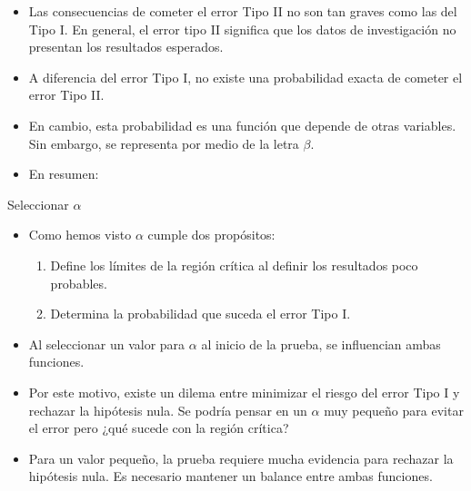 \documentclass{beamer}
\begin{document}
\begin{frame}
	\begin{itemize}
		\justifying
\item Las consecuencias de cometer el error Tipo II no son tan graves como las del Tipo I. En general, el error tipo II significa que los datos de investigación no presentan los resultados esperados.
\item A diferencia del error Tipo I, no existe una probabilidad exacta de cometer el error Tipo II.
\item En cambio, esta probabilidad es una función que depende de otras variables. Sin embargo, se representa por medio de la letra $\beta$.
\item En resumen:
	\end{itemize}
\begin{center}
\begin{table}[H]
\end{table}
\end{center}
\end{frame}

\begin{frame}{Seleccionar $\alpha$}
\begin{itemize}
\justifying
\item Como hemos visto $\alpha$ cumple dos propósitos:
\begin{enumerate}
\item Define los límites de la región crítica al definir los resultados poco probables.
\item Determina la probabilidad que suceda el error Tipo I.
\end{enumerate}
\item Al seleccionar un valor para $\alpha$ al inicio de la prueba, se influencian ambas funciones.
\item Por este motivo, existe un dilema entre minimizar el riesgo del error Tipo I y rechazar la hipótesis nula. Se podría pensar en un $\alpha$ muy pequeño para evitar el error pero ¿qué sucede con la región crítica?
\item Para un valor pequeño, la prueba requiere mucha evidencia para rechazar la hipótesis nula. Es necesario mantener un balance entre ambas funciones.
\end{itemize}
\end{frame}
\end{document}

